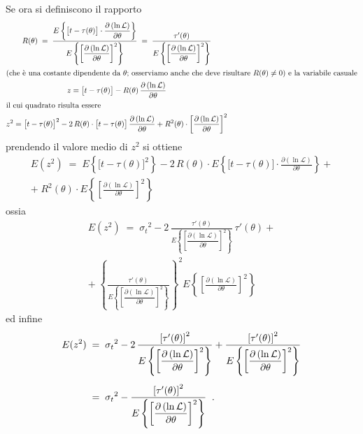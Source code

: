 Se ora si definiscono il rapporto
\begin{gather*}
  R(\theta) \; = \;
    \frac{ E \left \{ \bigl[ t -
    \tau(\theta) \bigr] \cdot
    \dfrac{\partial \left( \ln \mathcal{L} \right)}
    {\partial \theta} \right \} }
    {E \left\{ \left[ \dfrac{\partial \left( \ln
    \mathcal{L} \right)} {\partial \theta} \right]
    ^2 \right\} } \; = \; \frac{ \tau ' (\theta)}
    {E \left\{ \left[ \dfrac{\partial \left(
    \ln \mathcal{L} \right)} {\partial \theta}
    \right] ^2 \right\} } \\
  \intertext{(che \`e una costante dipendente
    da $\theta$; osserviamo anche che deve
    risultare $R(\theta) \neq 0$) e la
    variabile casuale}
  z = \bigl[ t - \tau(\theta) \bigr]
    - R(\theta) \,
    \frac{\partial \left( \ln \mathcal{L} \right)}
    {\partial \theta} \\
  \intertext{il cui quadrato risulta essere}
  z^2 = \bigl[ t - \tau(\theta) \bigr] ^2
    - 2 \, R(\theta) \cdot \bigl[ t - \tau(\theta)
    \bigr] \, \frac{\partial \left( \ln
    \mathcal{L} \right)}{\partial \theta} + R^2
    (\theta) \cdot \left[ \frac{\partial \left(
    \ln \mathcal{L} \right)}{\partial \theta}
    \right] ^2
\end{gather*}
prendendo il valore medio di $z^2$ si ottiene
\begin{multline*}
    E(z^2) \; = \; E \left \{ \bigl[ t -
      \tau(\theta) \bigr] ^2 \right \} -
      2 \, R(\theta) \cdot E \left \{ \bigl[
      t - \tau(\theta) \bigr] \cdot
      \frac{\partial \left( \ln \mathcal{L}
      \right)}{\partial \theta} \right \} +
      \\[1ex]
   + \; R^2 (\theta) \cdot E \left\{ \left[
    \frac{\partial \left( \ln \mathcal{L}
    \right)}{\partial \theta} \right] ^2
    \right\}
\end{multline*}
ossia
\begin{multline*}
  E(z^2) \; = \; {\sigma_t}^2 -
    2 \, \frac{\tau ' (\theta)}
    {E \left\{ \left[ \dfrac{\partial \left(
    \ln \mathcal{L} \right)}{\partial \theta}
    \right] ^2 \right\} }
    \, \tau ' (\theta) + \\[1ex]
  + \; \left \{ \frac{\tau ' (\theta)}
    {E \left\{ \left[ \dfrac{\partial \left(
    \ln \mathcal{L} \right)}{\partial \theta}
    \right] ^2 \right\} } \right\} ^2 E
    \left\{ \left[ \frac{\partial \left( \ln
    \mathcal{L} \right)}{\partial \theta}
    \right] ^2 \right\}
\end{multline*}
ed infine
\begin{align*}
  E(z^2) \; &= \; {\sigma_t}^2 -
    2 \, \frac{ \left[ \tau ' (\theta)
    \right] ^2 }{E \left\{ \left[
    \dfrac{\partial \left( \ln \mathcal{L}
    \right)}{\partial \theta} \right] ^2
    \right\} } +
    \frac{ \left[ \tau ' (\theta)
    \right] ^2 }{E \left\{ \left[
    \dfrac{\partial \left( \ln \mathcal{L}
    \right)}{\partial \theta} \right] ^2
    \right\} } \\[1ex]
  &= \; {\sigma_t}^2 -
    \frac{ \left[ \tau ' (\theta) \right] ^2 }
    {E \left\{ \left[ \dfrac{\partial \left(
    \ln \mathcal{L} \right)}{\partial \theta}
    \right] ^2 \right\} } \;\; .
\end{align*}

